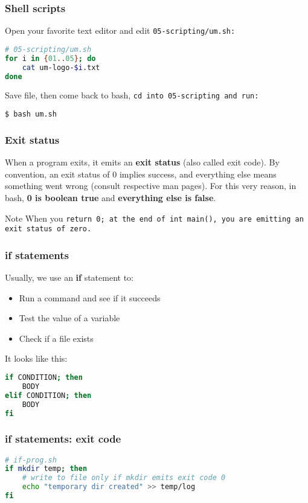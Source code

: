 \begin{frame}[fragile]
\frametitle{Shell scripts}
Open your favorite text editor and edit \tt{05-scripting/um.sh}:
\begin{lstlisting}[language=bash]
# 05-scripting/um.sh
for i in {01..05}; do
    cat um-logo-$i.txt
done
\end{lstlisting}
Save file, then come back to bash, \tt{cd} into \tt{05-scripting} and run:
\begin{lstlisting}[language=bash]
$ bash um.sh
\end{lstlisting}
\end{frame}

\begin{frame}
\frametitle{Exit status}
When a program exits, it emits an \textbf{exit status} (also called exit code).
By convention, an exit status of 0 implies success, and everything else means
something went wrong (consult respective man pages).
\newline \newline
For this very reason, in bash, \textbf{0 is boolean true} and
\textbf{everything else is false}.

\begin{block}{Note}
    When you \tt{return 0;} at the end of \tt{int main()}, you are
    emitting an exit status of zero.
\end{block}
\end{frame}

\begin{frame}[fragile]
\frametitle{\textbf{if} statements}
Usually, we use an \textbf{if} statement to:
\begin{itemize}
    \item Run a command and see if it succeeds
    \item Test the value of a variable
    \item Check if a file exists
\end{itemize}
It looks like this:
\begin{lstlisting}[language=bash]
if CONDITION; then
    BODY
elif CONDITION; then
    BODY
fi
\end{lstlisting}
\end{frame}

\begin{frame}[fragile]
\frametitle{\textbf{if} statements: exit code}
\begin{lstlisting}[language=bash]
# if-prog.sh
if mkdir temp; then
    # write to file only if mkdir emits exit code 0
    echo "temporary dir created" >> temp/log
fi
\end{lstlisting}
\end{frame}

